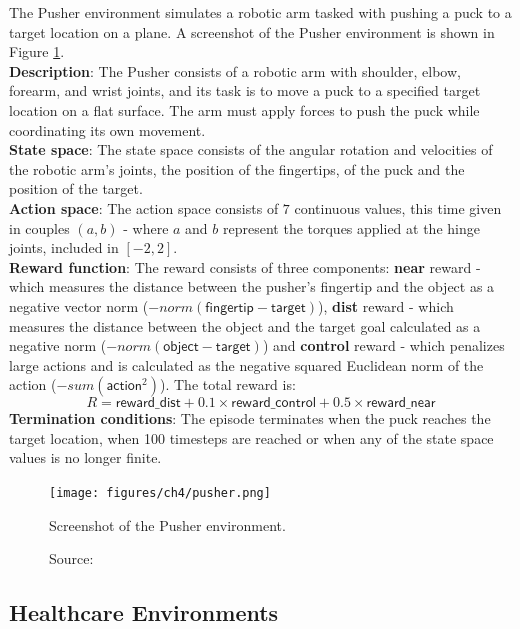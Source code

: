 The Pusher environment \cite{pusherfarama} simulates
a robotic arm tasked with pushing a puck to a target
location on a plane.
A screenshot of the Pusher environment is shown in Figure \ref{fig:pusher}.\\
\textbf{Description}: The Pusher consists of a
robotic arm with shoulder, elbow, forearm, and wrist joints,
and its task is to move a puck to a specified
target location on a flat surface.
The arm must apply forces to push the puck while
coordinating its own movement.\\
\textbf{State space}: The state space consists
of the angular rotation and velocities of the robotic arm's joints,
the position of the fingertips, of the puck and the position of the target.\\
\textbf{Action space}: The action space consists of $7$ continuous values,
this time given in couples $(a,b)$ - where 
$a$ and $b$ represent the torques applied at the hinge joints,
included in $[-2, 2]$.\\
\textbf{Reward function}: The reward consists of three components:
\textbf{near} reward - which measures the distance between the
pusher's fingertip and the object as a negative vector norm
($-norm(\textsf{fingertip} - \textsf{target})$),
\textbf{dist} reward - which measures the distance between
the object and the target goal calculated as a negative norm
($- norm(\textsf{object} - \textsf{target})$)
and \textbf{control} reward - which penalizes large actions
and is calculated as the negative squared Euclidean norm of the action
($- sum(\textsf{action}^2)$). The total reward is:
\begin{equation}
    R = \textsf{reward\_dist} + 0.1 \times \textsf{reward\_control} + 0.5 \times \textsf{reward\_near}
\end{equation}
\textbf{Termination conditions}: The episode terminates when the puck
reaches the target location, when 100 timesteps are reached
or when any of the state space values is no longer finite.

\begin{figure}[h]
    \centering
    \texttt{[image: figures/ch4/pusher.png]}
    \caption{Screenshot of the Pusher environment.}
    \vspace{-10px}
    \caption*{\scriptsize{Source: \cite{pusherpic}}}
    \label{fig:pusher}
\end{figure}

\subsection{Healthcare Environments}

